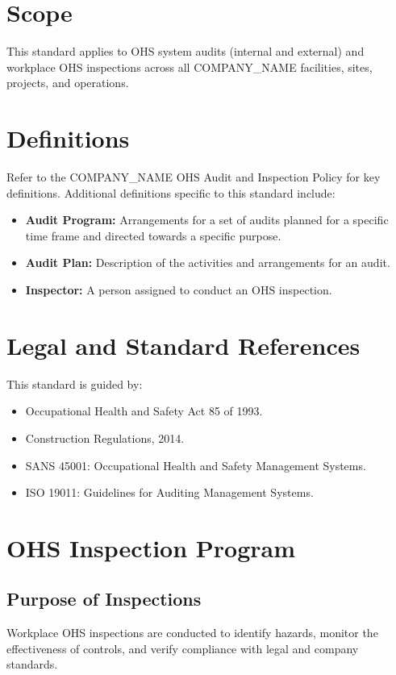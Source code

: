 \documentclass[12pt]{article}
\begin{document}
\section{Scope}
This standard applies to OHS system audits (internal and external) and workplace OHS inspections across all {{COMPANY_NAME}} facilities, sites, projects, and operations.

\section{Definitions}
Refer to the {{COMPANY_NAME}} OHS Audit and Inspection Policy for key definitions. Additional definitions specific to this standard include:
\begin{itemize}
    \item \textbf{Audit Program:} Arrangements for a set of audits planned for a specific time frame and directed towards a specific purpose.
    \item \textbf{Audit Plan:} Description of the activities and arrangements for an audit.
    \item \textbf{Inspector:} A person assigned to conduct an OHS inspection.
\end{itemize}

\section{Legal and Standard References}
This standard is guided by:
\begin{itemize}
    \item Occupational Health and Safety Act 85 of 1993.
    \item Construction Regulations, 2014.
    \item SANS 45001: Occupational Health and Safety Management Systems.
    \item ISO 19011: Guidelines for Auditing Management Systems.
\end{itemize}

\section{OHS Inspection Program}

\subsection{Purpose of Inspections}
Workplace OHS inspections are conducted to identify hazards, monitor the effectiveness of controls, and verify compliance with legal and company standards.
\end{document}
